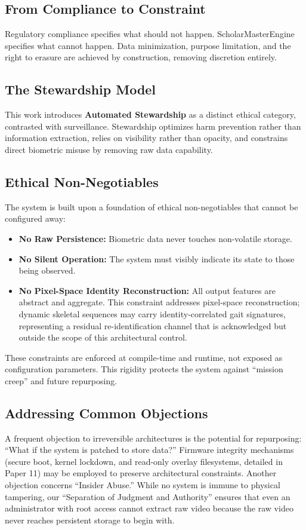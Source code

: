 \documentclass[conference]{IEEEtran}
\begin{document}
\subsection{From Compliance to Constraint}
Regulatory compliance specifies what should not happen. ScholarMasterEngine specifies what cannot happen. Data minimization, purpose limitation, and the right to erasure are achieved by construction, removing discretion entirely.

\subsection{The Stewardship Model}
This work introduces \textbf{Automated Stewardship} as a distinct ethical category, contrasted with surveillance. Stewardship optimizes harm prevention rather than information extraction, relies on visibility rather than opacity, and constrains direct biometric misuse by removing raw data capability.

\subsection{Ethical Non-Negotiables}
The system is built upon a foundation of ethical non-negotiables that cannot be configured away:
\begin{itemize}
    \item \textbf{No Raw Persistence:} Biometric data never touches non-volatile storage.
    \item \textbf{No Silent Operation:} The system must visibly indicate its state to those being observed.
    \item \textbf{No Pixel-Space Identity Reconstruction:} All output features are abstract and aggregate. This constraint addresses pixel-space reconstruction; dynamic skeletal sequences may carry identity-correlated gait signatures, representing a residual re-identification channel that is acknowledged but outside the scope of this architectural control.
\end{itemize}
These constraints are enforced at compile-time and runtime, not exposed as configuration parameters. This rigidity protects the system against ``mission creep'' and future repurposing.

\subsection{Addressing Common Objections}
A frequent objection to irreversible architectures is the potential for repurposing: ``What if the system is patched to store data?'' Firmware integrity mechanisms (secure boot, kernel lockdown, and read-only overlay filesystems, detailed in Paper 11) may be employed to preserve architectural constraints. Another objection concerns ``Insider Abuse.'' While no system is immune to physical tampering, our ``Separation of Judgment and Authority'' ensures that even an administrator with root access cannot extract raw video because the raw video never reaches persistent storage to begin with.
\end{document}
